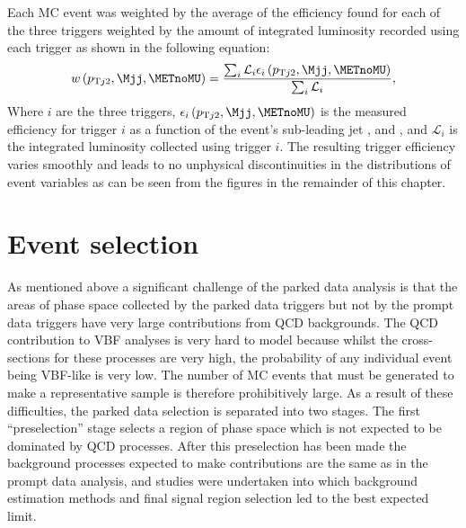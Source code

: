 Each \ac{MC} event was weighted by the average of the efficiency found for each of the three triggers weighted by the amount of integrated luminosity recorded using each trigger as shown in the following equation:
\begin{equation}
  \label{eq:parkedtrigweight}
  w\left(p_{\mathrm{T}j2},\Mjj,\METnoMU\right)=\frac{\sum_{i}\mathcal{L}_{i}\epsilon_{i}\left(p_{\mathrm{T}j2},\Mjj,\METnoMU\right)}{\sum_{i}\mathcal{L}_{i}},
\end{equation}
Where $i$ are the three triggers, $\epsilon_{i}\left(p_{\mathrm{T}j2},\Mjj,\METnoMU\right)$ is the measured efficiency for trigger $i$ as a function of the event's sub-leading jet \pt, \Mjj and \METnoMU, and $\mathcal{L}_{i}$ is the integrated luminosity collected using trigger $i$. The resulting trigger efficiency varies smoothly and leads to no unphysical discontinuities in the distributions of event variables as can be seen from the figures in the remainder of this chapter.

\section{Event selection}
\label{sec:parkedsel}
As mentioned above a significant challenge of the parked data analysis is that the areas of phase space collected by the parked data triggers but not by the prompt data triggers have very large contributions from \ac{QCD} backgrounds. The \ac{QCD} contribution to \ac{VBF} analyses is very hard to model because whilst the cross-sections for these processes are very high, the probability of any individual event being \ac{VBF}-like is very low. The number of \ac{MC} events that must be generated to make a representative sample is therefore prohibitively large. As a result of these difficulties, the parked data selection is separated into two stages. The first ``preselection'' stage selects a region of phase space which is not expected to be dominated by \ac{QCD} processes. After this preselection has been made the background processes expected to make contributions are the same as in the prompt data analysis, and studies were undertaken into which background estimation methods and final signal region selection led to the best expected limit.


